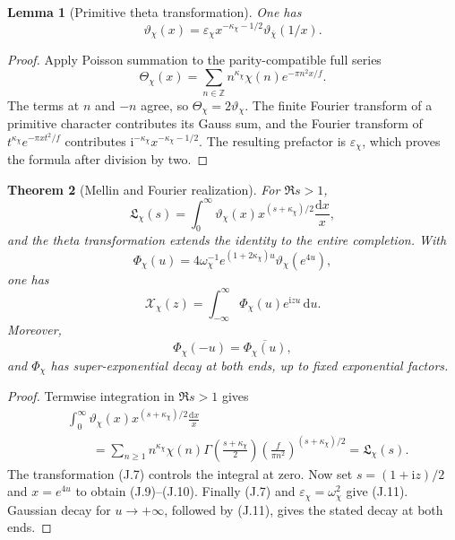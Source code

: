 \documentclass[11pt]{article}
\newtheorem{theorem}{Theorem}[section]
\newtheorem{lemma}[theorem]{Lemma}
\theoremstyle{definition}
\theoremstyle{remark}
\newcommand{\Z}{\mathbb Z}
\newcommand{\dd}{\mathrm d}
\begin{document}
\begin{lemma}[Primitive theta transformation]
\label{lem:theta-transform}
One has
\[
 \boxed{
 \vartheta_\chi(x)
 =\varepsilon_\chi x^{-\kappa_\chi-1/2}
  \vartheta_{\overline\chi}(1/x).}
 \tag{J.7}
\]
\end{lemma}

\begin{proof}
Apply Poisson summation to the parity-compatible full series
\[
 \Theta_\chi(x)
 =\sum_{n\in\Z}n^{\kappa_\chi}\chi(n)e^{-\pi n^2x/f}.
\]
The terms at $n$ and $-n$ agree, so $\Theta_\chi=2\vartheta_\chi$.  The
finite Fourier transform of a primitive character contributes its Gauss sum,
and the Fourier transform of
$t^{\kappa_\chi}e^{-\pi xt^2/f}$ contributes
$\mathrm i^{-\kappa_\chi}x^{-\kappa_\chi-1/2}$.  The resulting prefactor is
$\varepsilon_\chi$, which proves the formula after division by two.
\end{proof}

\begin{theorem}[Mellin and Fourier realization]
\label{thm:theta-Fourier}
For $\Re s>1$,
\[
 \mathfrak L_\chi(s)
 =\int_0^\infty\vartheta_\chi(x)
  x^{(s+\kappa_\chi)/2}\frac{\dd x}{x},
 \tag{J.8}
\]
and the theta transformation extends the identity to the entire completion.
With
\[
 \boxed{
 \Phi_\chi(u)
 =4\omega_\chi^{-1}e^{(1+2\kappa_\chi)u}
  \vartheta_\chi(e^{4u}),}
 \tag{J.9}
\]
one has
\[
 \boxed{
 \mathscr X_\chi(z)
 =\int_{-\infty}^{\infty}\Phi_\chi(u)e^{\mathrm i zu}\,\dd u.}
 \tag{J.10}
\]
Moreover,
\[
 \Phi_\chi(-u)=\overline{\Phi_\chi(u)},
 \tag{J.11}
\]
and $\Phi_\chi$ has super-exponential decay at both ends, up to fixed
exponential factors.
\end{theorem}

\begin{proof}
Termwise integration in $\Re s>1$ gives
\[
 \begin{aligned}
 &\int_0^\infty\vartheta_\chi(x)
  x^{(s+\kappa_\chi)/2}\frac{\dd x}{x}\\
 &\qquad=\sum_{n\ge1}n^{\kappa_\chi}\chi(n)
   \Gamma\!\left(\frac{s+\kappa_\chi}{2}\right)
   \left(\frac{f}{\pi n^2}\right)^{(s+\kappa_\chi)/2}
 =\mathfrak L_\chi(s).
 \end{aligned}
\]
The transformation \textup{(J.7)} controls the integral at zero.  Now set
$s=(1+\mathrm i z)/2$ and $x=e^{4u}$ to obtain \textup{(J.9)}--\textup{(J.10)}.
Finally \textup{(J.7)} and $\varepsilon_\chi=\omega_\chi^2$ give
\textup{(J.11)}.  Gaussian decay for $u\to+\infty$, followed by
\textup{(J.11)}, gives the stated decay at both ends.
\end{proof}
\end{document}
